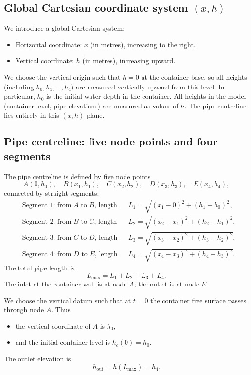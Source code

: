 \documentclass[11pt]{article}
\begin{document}
\subsection{Global Cartesian coordinate system $(x,h)$}

We introduce a global Cartesian system:
\begin{itemize}
  \item Horizontal coordinate: $x$ (in metres), increasing to the right.
  \item Vertical coordinate: $h$ (in metres), increasing upward.
\end{itemize}
We choose the vertical origin such that $h=0$ at the container base, so all heights (including $h_0,h_1,\dots,h_4$) are measured vertically upward from this level. In particular, $h_0$ is the initial water depth in the container.
All heights in the model (container level, pipe elevations) are measured as values of $h$.
The pipe centreline lies entirely in this $(x,h)$ plane.

\subsection{Pipe centreline: five node points and four segments}

The pipe centreline is defined by five node points
\[
A(0,h_0),\quad B(x_1,h_1),\quad C(x_2,h_2),\quad D(x_3,h_3),\quad E(x_4,h_4),
\]
connected by straight segments:
\begin{align*}
  &\text{Segment 1: from $A$ to $B$, length} &&
    L_1 = \sqrt{(x_1 - 0)^2 + (h_1 - h_0)^2},\\
  &\text{Segment 2: from $B$ to $C$, length} &&
    L_2 = \sqrt{(x_2 - x_1)^2 + (h_2 - h_1)^2},\\
  &\text{Segment 3: from $C$ to $D$, length} &&
    L_3 = \sqrt{(x_3 - x_2)^2 + (h_3 - h_2)^2},\\
  &\text{Segment 4: from $D$ to $E$, length} &&
    L_4 = \sqrt{(x_4 - x_3)^2 + (h_4 - h_3)^2}.
\end{align*}
The total pipe length is
\[
  L_{\max} = L_1 + L_2 + L_3 + L_4.
\]
The inlet at the container wall is at node $A$; the outlet is at node $E$.

We choose the vertical datum such that at $t=0$ the container free surface passes through
node $A$. Thus
\begin{itemize}
  \item the vertical coordinate of $A$ is $h_0$,
  \item and the initial container level is $h_c(0) = h_0$.
\end{itemize}
The outlet elevation is
\[
  h_{\text{out}} = h(L_{\max}) = h_4.
\]
\end{document}
